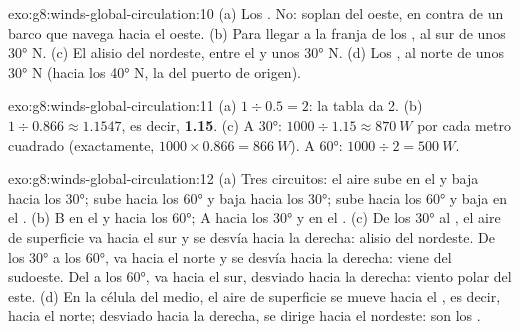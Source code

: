 \begin{solution}{exo:g8:winds-global-circulation:10}
(a) Los . No: soplan del oeste, en contra de un barco que
navega hacia el oeste. (b) Para llegar a la franja de los , al sur
de unos \ang{30} N. (c) El alisio del nordeste, entre el  y unos
\ang{30} N. (d) Los , al norte de unos \ang{30} N (hacia
los \ang{40} N, la  del puerto de origen).
\end{solution}

\begin{solution}{exo:g8:winds-global-circulation:11}
(a) $1 \div 0.5 = 2$: la tabla da 2. (b) $1 \div 0.866 \approx
1.1547$, es decir, \textbf{1.15}. (c) A \ang{30}: $1000 \div 1.15 \approx
\qty{870}{W}$ por cada metro cuadrado (exactamente, $1000 \times 0.866 =
\qty{866}{W}$). A \ang{60}: $1000 \div 2 = \qty{500}{W}$.
\end{solution}

\begin{solution}{exo:g8:winds-global-circulation:12}
(a) Tres circuitos: el aire sube en el  y baja hacia los \ang{30};
sube hacia los \ang{60} y baja hacia los \ang{30}; sube hacia los \ang{60}
y baja en el . (b) B en el  y hacia los \ang{60}; A hacia los
\ang{30} y en el . (c) De los \ang{30} al , el aire de
superficie va hacia el sur y se desvía hacia la derecha: alisio del
nordeste. De los \ang{30} a los \ang{60}, va hacia el norte y se desvía
hacia la derecha: viene del sudoeste. Del  a los \ang{60}, va hacia el
sur, desviado hacia la derecha: viento polar del este. (d) En la célula del
medio, el aire de superficie se mueve hacia el , es decir, hacia el
norte; desviado hacia la derecha, se dirige hacia el nordeste: son los
.
\end{solution}

